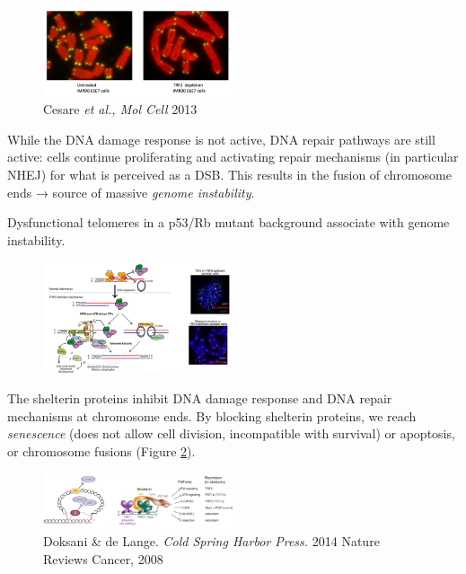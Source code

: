 \begin{figure}
\centering
\includegraphics[width=0.5\textwidth]{../_resources/Screen_Shot_2022-12-15_at_17-54-31.png}
\caption{Cesare \emph{et al., Mol Cell} 2013}
\label{fig:ends}
\end{figure}

While the DNA damage response is not active, DNA repair pathways are
still active: cells continue proliferating and activating repair
mechanisms (in particular NHEJ) for what is perceived as a DSB. This
results in the fusion of chromosome ends → source of massive
\emph{genome instability}.

Dysfunctional telomeres in a p53/Rb mutant background associate with
genome instability.

\begin{figure}
\centering
\includegraphics[width=0.5\textwidth]{../_resources/Screen_Shot_2022-12-15_at_17-49-51.png}
\caption{}
\end{figure}

The shelterin proteins inhibit DNA damage response and DNA repair
mechanisms at chromosome ends. By blocking shelterin
proteins, we reach \emph{senescence} (does not allow cell division,
incompatible with survival) or apoptosis, or chromosome fusions (Figure \ref{fig:bsh}).

\begin{figure}
\centering
\includegraphics[width=0.5\textwidth]{../_resources/Screen_Shot_2022-12-15_at_17-49-02.png}
\caption{Doksani \& de Lange. \emph{Cold Spring Harbor Press.} 2014
Nature Reviews Cancer, 2008}
\label{fig:bsh}
\end{figure}

